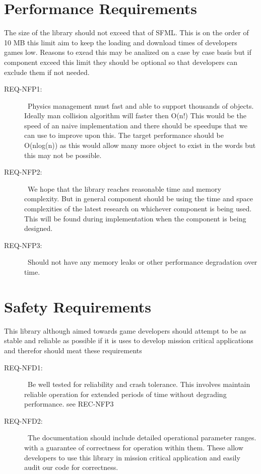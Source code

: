 \documentclass{scrreprt}
\begin{document}
\section{Performance Requirements}




The size of the library should not exceed that of SFML.  This is on the order of 10 MB this limit aim to keep the loading and download times of developers games low.  Reasons to exead this may be analized on a case by case basis but if component exceed this limit they should be optional so that developers can exclude them if not needed.


\begin{description}
\item [{REQ-NFP1:}]~Physics management must fast and able to support thousands of objects. Ideally man collision algorithm will faster then O(n!) This would be the speed of an naive implementation and there should be speedups that we can use to improve upon this.  The target performance should be O(nlog(n)) as this would allow many more object to exist in the words but this may not be possible.
\item [{REQ-NFP2:}]~We hope that the library reaches reasonable time and memory complexity. But in general component should be using the time and space complexities of the latest  research on whichever component is being used.  This will be found during implementation when the component is being designed.
\item [{REQ-NFP3:}]~Should not have any memory leaks or other performance degradation over time.
\end{description}


\section{Safety Requirements}
This library although aimed towards game developers should attempt to be as stable and reliable as possible if it is uses to develop mission critical applications and therefor should meat these requirements
\begin{description}
\item [{REQ-NFD1:}]~Be well tested for reliability and crash tolerance.  This involves maintain reliable operation for extended periods of time without degrading performance. see REC-NFP3
\item [{REQ-NFD2:}]~The documentation should include detailed operational parameter ranges. with a guarantee of correctness for operation within them.  These allow developers to use this library in mission critical application and easily audit our code for correctness.


\end{description}
\end{document}
